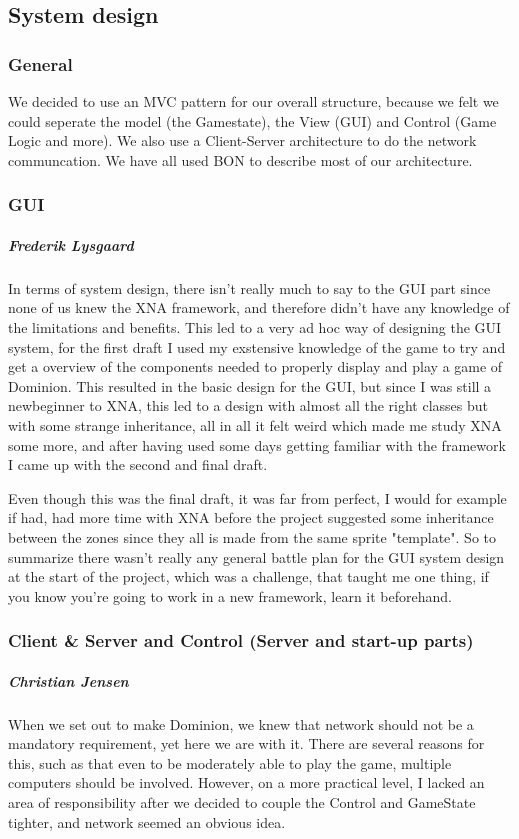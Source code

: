 \subsection{System design}
\subsubsection{General}
We decided to use an MVC pattern for our overall structure, because we felt we could seperate the model (the Gamestate), the View (GUI) and Control (Game Logic and more). We also use a Client-Server architecture to do the network communcation. We have all used BON to describe most of our architecture.

\subsubsection{GUI}
\subparagraph{Frederik Lysgaard}
In terms of system design, there isn't really much to say to the GUI part since none of us knew the XNA framework, and therefore didn't have any knowledge of the limitations and benefits.
This led to a very ad hoc way of designing the GUI system, for the first draft I used my exstensive knowledge of the game to try and get a overview of the components needed to properly display and play a game of Dominion. 
This resulted in the basic design for the GUI, but since I was still a newbeginner to XNA, this led to a design with almost all the right classes but with some strange inheritance, all in all it felt weird which made me study XNA some more, and after having used some days getting familiar with the framework I came up with the second and final draft.

Even though this was the final draft, it was far from perfect, I would for example if had, had more time with XNA before the project suggested some inheritance between the zones since they all is made from the same sprite "template". So to summarize there wasn't really any general battle plan for the GUI system design at the start of the project, which was a challenge, that taught me one thing, if you know you're going to work in a new framework, learn it beforehand.

\subsubsection{Client \& Server and Control (Server and start-up parts)}
\subparagraph{Christian Jensen}
When we set out to make Dominion, we knew that network should not be a mandatory requirement, yet here we are with it.
There are several reasons for this, such as that even to be moderately able to play the game, multiple computers should be involved.
However, on a more practical level, I lacked an area of responsibility after we decided to couple the Control and GameState tighter, and network seemed an obvious idea.

